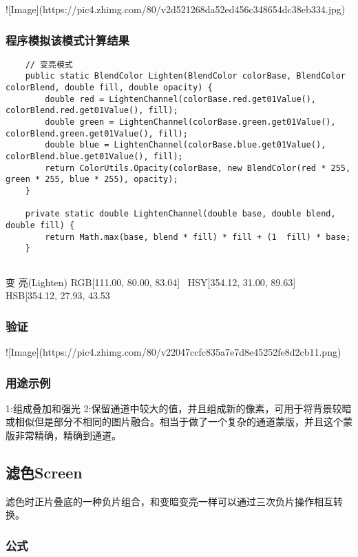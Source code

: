 ![Image](https://pic4.zhimg.com/80/v2d521268da52ed456c348654dc38eb334.jpg)

\subsubsection{ 程序模拟该模式计算结果}

\begin{lstlisting}
	// 变亮模式
	public static BlendColor Lighten(BlendColor colorBase, BlendColor colorBlend, double fill, double opacity) {
		double red = LightenChannel(colorBase.red.get01Value(), colorBlend.red.get01Value(), fill);
		double green = LightenChannel(colorBase.green.get01Value(), colorBlend.green.get01Value(), fill);
		double blue = LightenChannel(colorBase.blue.get01Value(), colorBlend.blue.get01Value(), fill);
		return ColorUtils.Opacity(colorBase, new BlendColor(red * 255, green * 255, blue * 255), opacity);
	}
	
	private static double LightenChannel(double base, double blend, double fill) {
		return Math.max(base, blend * fill) * fill + (1  fill) * base;
	}
	
\end{lstlisting}


变    亮(Lighten)       RGB[111.00,  80.00,  83.04]~ HSY[354.12,  31.00,  89.63]~ HSB[354.12,  27.93,  43.53


\subsubsection{ 验证}

![Image](https://pic4.zhimg.com/80/v22047ccfc835a7e7d8e45252fe8d2cb11.png)

\subsubsection{ 用途示例}

1:组成叠加和强光
2:保留通道中较大的值，并且组成新的像素，可用于将背景较暗或相似但是部分不相同的图片融合。相当于做了一个复杂的通道蒙版，并且这个蒙版非常精确，精确到通道。

\subsection{ 滤色Screen}

滤色时正片叠底的一种负片组合，和变暗变亮一样可以通过三次负片操作相互转换。

\subsubsection{ 公式}

